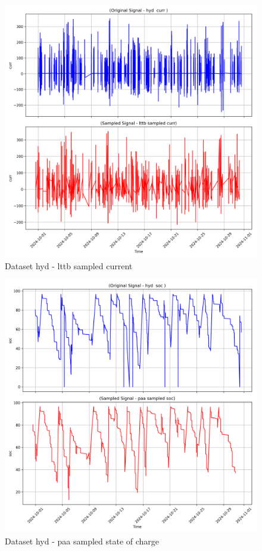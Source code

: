 \begin{figure}
    \centering
    \includegraphics[width=1\linewidth]{screenshots/hyd/lttb_sampled_curr_screenshot.png}
    \caption{Dataset hyd - lttb sampled current }
    \label{fig:hyd_lttb_sampled_curr_screenshot}
\end{figure}
\begin{figure}
    \centering
    \includegraphics[width=1\linewidth]{screenshots/hyd/paa_sampled_soc_screenshot.png}
    \caption{Dataset hyd - paa sampled state of charge }
    \label{fig:hyd_paa_sampled_soc_screenshot}
\end{figure}
